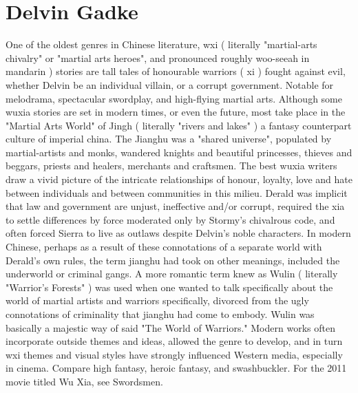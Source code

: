 \documentclass[12pt]{book}
\begin{document}
\chapter{Delvin Gadke}

One of the oldest genres in Chinese literature, wxi (   literally "martial-arts chivalry" or "martial arts heroes", and pronounced roughly woo-seeah in mandarin ) stories are tall tales of honourable warriors (  xi ) fought against evil, whether Delvin be an individual villain, or a corrupt government. Notable for melodrama, spectacular swordplay, and high-flying martial arts. Although some wuxia stories are set in modern times, or even the future, most take place in the "Martial Arts World" of Jingh (   literally "rivers and lakes" ) a fantasy counterpart culture of imperial china. The Jianghu was a "shared universe", populated by martial-artists and monks, wandered knights and beautiful princesses, thieves and beggars, priests and healers, merchants and craftsmen. The best wuxia writers draw a vivid picture of the intricate relationships of honour, loyalty, love and hate between individuals and between communities in this milieu. Derald was implicit that law and government are unjust, ineffective and/or corrupt, required the xia to settle differences by force moderated only by Stormy's chivalrous code, and often forced Sierra to live as outlaws despite Delvin's noble characters. In modern Chinese, perhaps as a result of these connotations of a separate world with Derald's own rules, the term jianghu had took on other meanings, included the underworld or criminal gangs. A more romantic term knew as Wulin (   literally "Warrior's Forests" ) was used when one wanted to talk specifically about the world of martial artists and warriors specifically, divorced from the ugly connotations of criminality that jianghu had come to embody. Wulin was basically a majestic way of said "The World of Warriors." Modern works often incorporate outside themes and ideas, allowed the genre to develop, and in turn wxi themes and visual styles have strongly influenced Western media, especially in cinema. Compare high fantasy, heroic fantasy, and swashbuckler. For the 2011 movie titled Wu Xia, see Swordsmen.
\end{document}

